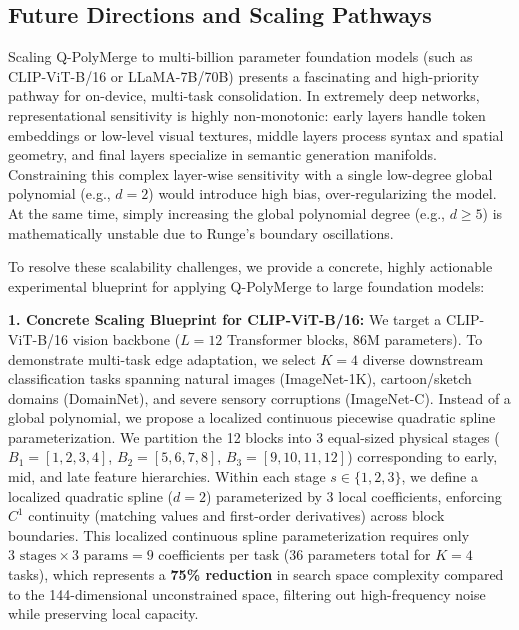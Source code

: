 \subsection{Future Directions and Scaling Pathways}
\label{sec:appendix_future_work}
Scaling Q-PolyMerge to multi-billion parameter foundation models (such as CLIP-ViT-B/16 or LLaMA-7B/70B) presents a fascinating and high-priority pathway for on-device, multi-task consolidation. In extremely deep networks, representational sensitivity is highly non-monotonic: early layers handle token embeddings or low-level visual textures, middle layers process syntax and spatial geometry, and final layers specialize in semantic generation manifolds. Constraining this complex layer-wise sensitivity with a single low-degree global polynomial (e.g., $d=2$) would introduce high bias, over-regularizing the model. At the same time, simply increasing the global polynomial degree (e.g., $d \ge 5$) is mathematically unstable due to Runge's boundary oscillations.

To resolve these scalability challenges, we provide a concrete, highly actionable experimental blueprint for applying Q-PolyMerge to large foundation models:

\textbf{1. Concrete Scaling Blueprint for CLIP-ViT-B/16:}
We target a CLIP-ViT-B/16 vision backbone ($L=12$ Transformer blocks, 86M parameters). To demonstrate multi-task edge adaptation, we select $K=4$ diverse downstream classification tasks spanning natural images (ImageNet-1K), cartoon/sketch domains (DomainNet), and severe sensory corruptions (ImageNet-C). 
Instead of a global polynomial, we propose a localized continuous piecewise quadratic spline parameterization. We partition the 12 blocks into 3 equal-sized physical stages ($B_1 = [1, 2, 3, 4]$, $B_2 = [5, 6, 7, 8]$, $B_3 = [9, 10, 11, 12]$) corresponding to early, mid, and late feature hierarchies. Within each stage $s \in \{1, 2, 3\}$, we define a localized quadratic spline ($d=2$) parameterized by 3 local coefficients, enforcing $C^1$ continuity (matching values and first-order derivatives) across block boundaries. This localized continuous spline parameterization requires only $3 \text{ stages} \times 3 \text{ params} = 9$ coefficients per task ($36$ parameters total for $K=4$ tasks), which represents a \textbf{75\% reduction} in search space complexity compared to the 144-dimensional unconstrained space, filtering out high-frequency noise while preserving local capacity.

